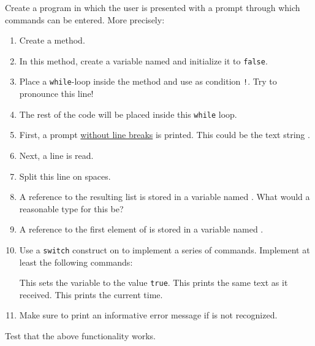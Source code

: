 Create a program in which the user is presented with a prompt through which commands can be entered. More precisely:
\begin{enumerate}
  \item Create a  method.
  \item In this method, create a  variable named  and initialize it to \texttt{false}.
  \item Place a \texttt{while}-loop inside the  method and use as condition \texttt{!}. Try to pronounce this line!
  \item The rest of the code will be placed inside this \texttt{while} loop.
  \item First, a prompt \underline{without line breaks} is printed. This could be the text string \say{\texttt{\$ }}.
  \item Next, a line is read.
  \item Split this line on spaces.
  \item A reference to the resulting list is stored in a variable named . What would a reasonable type for this be?
  \item A reference to the first element of  is stored in a variable named .
  \item Use a \texttt{switch} construct on  to implement a series of commands. Implement at least the following commands:
    \begin{enumerate}
       This sets the variable  to the value \texttt{true}.
       This prints the same text as it received.
       This prints the current time.
    \end{enumerate}
  \item Make sure to print an informative error message if  is not recognized.
\end{enumerate}

Test that the above functionality works.
